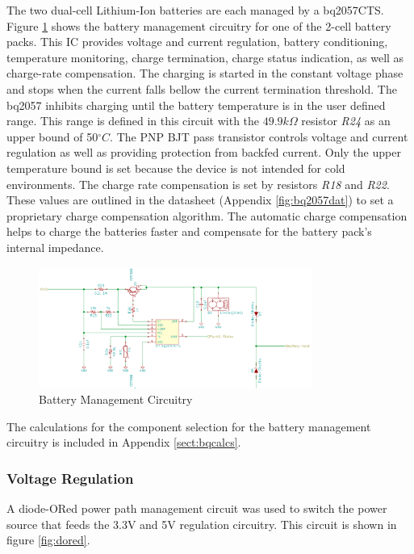 \documentclass{article}
\numberwithin{figure}{section}
\numberwithin{equation}{section}
\begin{document}
{The two dual-cell Lithium-Ion batteries are each managed by a bq2057CTS. Figure \ref{fig:batman} shows the battery management circuitry for one of the 2-cell battery packs. This IC provides voltage and current regulation, battery conditioning, temperature monitoring, charge termination, charge status indication, as well as charge-rate compensation. The charging is started in the constant voltage phase and stops when the current falls bellow the current termination threshold. The bq2057 inhibits charging until the battery temperature is in the user defined range. This range is defined in this circuit with the $49.9k\Omega$ resistor \textit{R24} as an upper bound of 50$^{\circ}C$. The PNP BJT pass transistor controls voltage and current regulation as well as providing protection from backfed current. Only the upper temperature bound is set because the device is not intended for cold environments. The charge rate compensation is set by resistors \textit{R18} and \textit{R22}. These values are outlined in the datasheet (Appendix \ref{fig:bq2057dat}) to set a proprietary charge compensation algorithm. The automatic charge compensation helps to charge the batteries faster and compensate for the battery pack's internal impedance.

\begin{figure}[H]
	\centering
	\includegraphics[width=0.8\textwidth]{BatteryManage}
	\caption{Battery Management Circuitry}
	\label{fig:batman}
\end{figure}

The calculations for the component selection for the battery management circuitry is included in Appendix \ref{sect:bqcalcs}.

\subsubsection{Voltage Regulation}

A diode-ORed power path management circuit was used to switch the power source that feeds the 3.3V and 5V regulation circuitry. This circuit is shown in figure \ref{fig:dored}.

}
\end{document}
